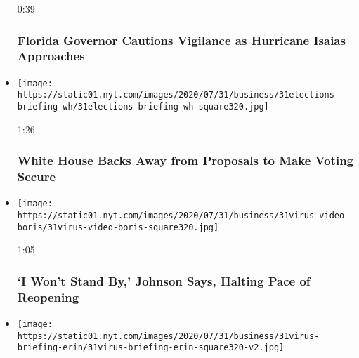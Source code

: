 \begin{itemize}
  0:39

  \hypertarget{florida-governor-cautions-vigilance-as-hurricane-isaias-approaches}{%
  \subsubsection{Florida Governor Cautions Vigilance as Hurricane Isaias
  Approaches}\label{florida-governor-cautions-vigilance-as-hurricane-isaias-approaches}}
\item
  \href{https://www.nytimes.com/video/us/100000007267362/white-house-mail-in-ballots-election.html?action=click\&module=video-series-bar\&region=header\&pgtype=Article\&playlistId=video/latest-video}{}

  \texttt{[image: https://static01.nyt.com/images/2020/07/31/business/31elections-briefing-wh/31elections-briefing-wh-square320.jpg]}

  1:26

  \hypertarget{white-house-backs-away-from-proposals-to-make-voting-secure}{%
  \subsubsection{White House Backs Away from Proposals to Make Voting
  Secure}\label{white-house-backs-away-from-proposals-to-make-voting-secure}}
\item
  \href{https://www.nytimes.com/video/us/politics/100000007266983/johnson-coronavirus-restrictions.html?action=click\&module=video-series-bar\&region=header\&pgtype=Article\&playlistId=video/latest-video}{}

  \texttt{[image: https://static01.nyt.com/images/2020/07/31/business/31virus-video-boris/31virus-video-boris-square320.jpg]}

  1:05

  \hypertarget{i-wont-stand-by-johnson-says-halting-pace-of-reopening}{%
  \subsubsection{`I Won't Stand By,' Johnson Says, Halting Pace of
  Reopening}\label{i-wont-stand-by-johnson-says-halting-pace-of-reopening}}
\item
  \href{https://www.nytimes.com/video/us/politics/100000007266691/fauci-congress-testimony.html?action=click\&module=video-series-bar\&region=header\&pgtype=Article\&playlistId=video/latest-video}{}

  \texttt{[image: https://static01.nyt.com/images/2020/07/31/business/31virus-briefing-erin/31virus-briefing-erin-square320-v2.jpg]}


\end{itemize}
